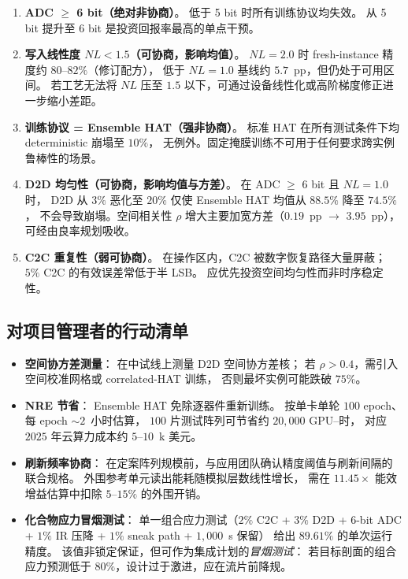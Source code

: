 \begin{enumerate}
    \item \textbf{ADC $\ge$ 6 bit（绝对非协商）}。
    低于 5 bit 时所有训练协议均失效。
    从 5 bit 提升至 6 bit 是投资回报率最高的单点干预。

    \item \textbf{写入线性度 $NL < 1.5$（可协商，影响均值）}。
    $NL=2.0$ 时 fresh-instance 精度约 $80$--$82\%$（修订配方），
    低于 $NL=1.0$ 基线约 $5.7$~pp，但仍处于可用区间。
    若工艺无法将 $NL$ 压至 $1.5$ 以下，可通过设备线性化或高阶梯度修正进一步缩小差距。

    \item \textbf{训练协议 = Ensemble HAT（强非协商）}。
    标准 HAT 在所有测试条件下均 deterministic 崩塌至 $10\%$，
    无例外。固定掩膜训练不可用于任何要求跨实例鲁棒性的场景。

    \item \textbf{D2D 均匀性（可协商，影响均值与方差）}。
    在 ADC $\ge$ 6 bit 且 $NL=1.0$ 时，
    D2D 从 $3\%$ 恶化至 $20\%$ 仅使 Ensemble HAT 均值从 $88.5\%$ 降至 $74.5\%$，
    不会导致崩塌。空间相关性 $\rho$ 增大主要加宽方差（$0.19$~pp $\to$ $3.95$~pp），
    可经由良率规划吸收。

    \item \textbf{C2C 重复性（弱可协商）}。
    在操作区内，C2C 被数字恢复路径大量屏蔽；
    $5\%$ C2C 的有效误差常低于半 LSB。
    应优先投资空间均匀性而非时序稳定性。
\end{enumerate}

\subsection{对项目管理者的行动清单}

\begin{itemize}
    \item \textbf{空间协方差测量}：
    在中试线上测量 D2D 空间协方差核；
    若 $\rho > 0.4$，需引入空间校准网格或 correlated-HAT 训练，
    否则最坏实例可能跌破 $75\%$。

    \item \textbf{NRE 节省}：
    Ensemble HAT 免除逐器件重新训练。
    按单卡单轮 $100$ epoch、每 epoch $\sim$$2$~小时估算，
    $100$ 片测试阵列可节省约 $20{,}000$ GPU--时，
    对应 $2025$ 年云算力成本约 $5$--$10$~k 美元。

    \item \textbf{刷新频率协商}：
    在定案阵列规模前，与应用团队确认精度阈值与刷新间隔的联合规格。
    外围参考单元读出能耗随模拟层数线性增长，
    需在 $11.45\times$ 能效增益估算中扣除 $5$--$15\%$ 的外围开销。

    \item \textbf{化合物应力冒烟测试}：
    单一组合应力测试（$2\%$ C2C + $3\%$ D2D + 6-bit ADC + $1\%$ IR 压降 + $1\%$  sneak path + $1{,}000$~s 保留）
    给出 $89.61\%$ 的单次运行精度。
    该值非锁定保证，但可作为集成计划的\emph{冒烟测试}：
    若目标剖面的组合应力预测低于 $80\%$，设计过于激进，应在流片前降规。
\end{itemize}

